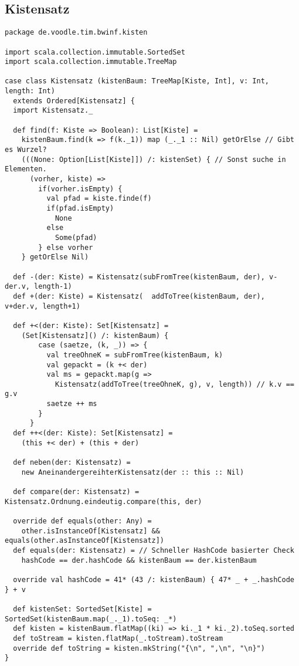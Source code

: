 \clearpage
\subsection{Kistensatz}
\begin{lstlisting}
package de.voodle.tim.bwinf.kisten

import scala.collection.immutable.SortedSet
import scala.collection.immutable.TreeMap

case class Kistensatz (kistenBaum: TreeMap[Kiste, Int], v: Int, length: Int)
  extends Ordered[Kistensatz] {
  import Kistensatz._

  def find(f: Kiste => Boolean): List[Kiste] =
    kistenBaum.find(k => f(k._1)) map (_._1 :: Nil) getOrElse // Gibt es Wurzel?
    (((None: Option[List[Kiste]]) /: kistenSet) { // Sonst suche in Elementen.
      (vorher, kiste) =>
        if(vorher.isEmpty) {
          val pfad = kiste.finde(f)
          if(pfad.isEmpty)
            None
          else
            Some(pfad)
        } else vorher
    } getOrElse Nil)

  def -(der: Kiste) = Kistensatz(subFromTree(kistenBaum, der), v-der.v, length-1)
  def +(der: Kiste) = Kistensatz(  addToTree(kistenBaum, der), v+der.v, length+1)
  
  def +<(der: Kiste): Set[Kistensatz] =
    (Set[Kistensatz]() /: kistenBaum) {
        case (saetze, (k, _)) => {
          val treeOhneK = subFromTree(kistenBaum, k)
          val gepackt = (k +< der)
          val ms = gepackt.map(g =>
            Kistensatz(addToTree(treeOhneK, g), v, length)) // k.v == g.v
          saetze ++ ms
        }
      }
  def ++<(der: Kiste): Set[Kistensatz] =
    (this +< der) + (this + der)

  def neben(der: Kistensatz) =
    new AneinandergereihterKistensatz(der :: this :: Nil)

  def compare(der: Kistensatz) = Kistensatz.Ordnung.eindeutig.compare(this, der)

  override def equals(other: Any) =
    other.isInstanceOf[Kistensatz] && equals(other.asInstanceOf[Kistensatz])
  def equals(der: Kistensatz) = // Schneller HashCode basierter Check
    hashCode == der.hashCode && kistenBaum == der.kistenBaum

  override val hashCode = 41* (43 /: kistenBaum) { 47* _ + _.hashCode } + v

  def kistenSet: SortedSet[Kiste] = SortedSet(kistenBaum.map(_._1).toSeq: _*)
  def kisten = kistenBaum.flatMap((ki) => ki._1 * ki._2).toSeq.sorted
  def toStream = kisten.flatMap(_.toStream).toStream
  override def toString = kisten.mkString("{\n", ",\n", "\n}")
}


\end{lstlisting}
